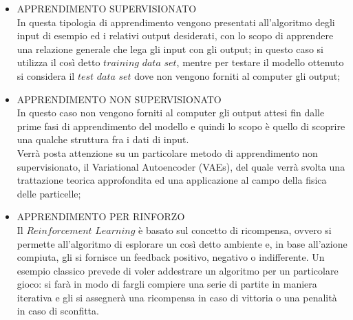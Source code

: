 \begin{itemize}
	\item APPRENDIMENTO SUPERVISIONATO \\
	In questa tipologia di apprendimento vengono presentati all'algoritmo degli input di esempio ed i relativi output desiderati, con lo scopo di apprendere una relazione generale che lega gli input con gli output; in questo caso si utilizza il così detto $\textit{training data set}$, mentre per testare il modello ottenuto si considera il $\textit{test data set}$ dove non vengono forniti al computer gli output;
	\item APPRENDIMENTO NON SUPERVISIONATO \\
	In questo caso non vengono forniti al computer gli output attesi fin dalle prime fasi di apprendimento del modello e quindi lo scopo è quello di scoprire una qualche struttura fra i dati di input.\\
	Verrà posta attenzione su un particolare metodo di apprendimento non supervisionato, il Variational Autoencoder (VAEs), del quale verrà svolta una trattazione teorica approfondita ed una applicazione al campo della fisica delle particelle;
	\item APPRENDIMENTO PER RINFORZO \\
	Il $\textit{Reinforcement Learning}$ è basato sul concetto di ricompensa, ovvero si permette all'algoritmo di esplorare un così detto ambiente e, in base all'azione compiuta, gli si fornisce un feedback positivo, negativo o indifferente. Un esempio classico prevede di voler addestrare un algoritmo per un particolare gioco: si farà in modo di fargli compiere una serie di partite in maniera iterativa e gli si assegnerà una ricompensa in caso di vittoria o una penalità in caso di sconfitta. \\ 
\end{itemize}

\newpage

